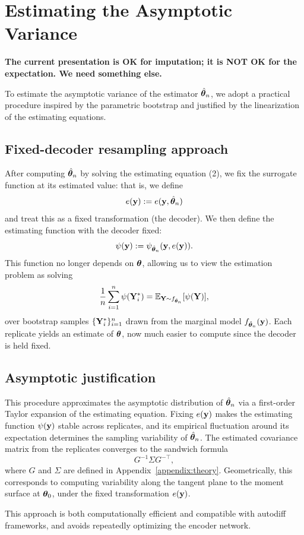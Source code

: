 \section{Estimating the Asymptotic Variance}
{\color{red}
\textbf{The current presentation is OK for imputation; it is NOT OK for the expectation. We need something else.}

\label{appendix:variance}

To estimate the asymptotic variance of the estimator $\hat{{\bm{\theta}}}_n$, we adopt a practical procedure inspired by the parametric bootstrap and justified by the linearization of the estimating equations.

\subsection*{Fixed-decoder resampling approach}

After computing $\hat{{\bm{\theta}}}_n$ by solving the estimating equation (2), we fix the surrogate function at its estimated value: that is, we define
\[
e({\bf y}) := e({\bf y}, \hat{{\bm{\theta}}}_n)
\]
and treat this as a fixed transformation (the decoder). We then define the estimating function with the decoder fixed:
\[
\psi({\bf y}) := \psi_{\hat{{\bm{\theta}}}_n}({\bf y}, e({\bf y})).
\]
This function no longer depends on ${\bm{\theta}}$, allowing us to view the estimation problem as solving
\[
\frac{1}{n} \sum_{i=1}^n \psi({\bf Y}_i^*) = \mathbb{E}_{{\bf Y} \sim f_{\hat{{\bm{\theta}}}_n}}[\psi({\bf Y})],
\]
over bootstrap samples $\{{\bf Y}_i^*\}_{i=1}^n$ drawn from the marginal model $f_{\hat{{\bm{\theta}}}_n}({\bf y})$. Each replicate yields an estimate of ${\bm{\theta}}$, now much easier to compute since the decoder is held fixed.

\subsection*{Asymptotic justification}

This procedure approximates the asymptotic distribution of $\hat{{\bm{\theta}}}_n$ via a first-order Taylor expansion of the estimating equation. Fixing $e({\bf y})$ makes the estimating function $\psi({\bf y})$ stable across replicates, and its empirical fluctuation around its expectation determines the sampling variability of $\hat{{\bm{\theta}}}_n$. The estimated covariance matrix from the replicates converges to the sandwich formula
\[
G^{-1} \Sigma G^{-\top},
\]
where $G$ and $\Sigma$ are defined in Appendix~\ref{appendix:theory}. Geometrically, this corresponds to computing variability along the tangent plane to the moment surface at ${\bm{\theta}}_0$, under the fixed transformation $e({\bf y})$.

This approach is both computationally efficient and compatible with autodiff frameworks, and avoids repeatedly optimizing the encoder network.

}